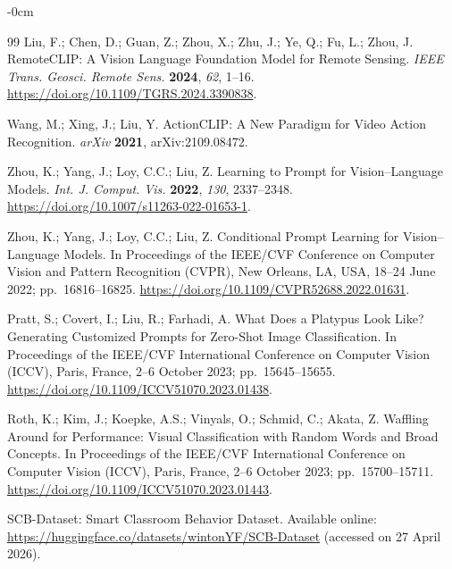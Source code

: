\documentclass[electronics,article,submit,pdftex,moreauthors]{Definitions/mdpi}
\begin{document}
\begin{adjustwidth}{-\extralength}{0cm}
\begin{thebibliography}{99}
Liu, F.; Chen, D.; Guan, Z.; Zhou, X.; Zhu, J.; Ye, Q.; Fu, L.; Zhou, J.
RemoteCLIP: A Vision Language Foundation Model for Remote Sensing.
\textit{IEEE Trans. Geosci. Remote Sens.} \textbf{2024}, \textit{62}, 1--16. \url{https://doi.org/10.1109/TGRS.2024.3390838}.

Wang, M.; Xing, J.; Liu, Y.
ActionCLIP: A New Paradigm for Video Action Recognition.
\textit{arXiv} \textbf{2021}, arXiv:2109.08472.

Zhou, K.; Yang, J.; Loy, C.C.; Liu, Z.
Learning to Prompt for Vision--Language Models.
\textit{Int. J. Comput. Vis.} \textbf{2022}, \textit{130}, 2337--2348. \url{https://doi.org/10.1007/s11263-022-01653-1}.

Zhou, K.; Yang, J.; Loy, C.C.; Liu, Z.
Conditional Prompt Learning for Vision--Language Models.
In Proceedings of the IEEE/CVF Conference on Computer Vision and Pattern Recognition (CVPR), New Orleans, LA, USA, 18--24 June 2022; pp.~16816--16825. \url{https://doi.org/10.1109/CVPR52688.2022.01631}.

Pratt, S.; Covert, I.; Liu, R.; Farhadi, A.
What Does a Platypus Look Like? Generating Customized Prompts for Zero-Shot Image Classification.
In Proceedings of the IEEE/CVF International Conference on Computer Vision (ICCV), Paris, France, 2--6 October 2023; pp.~15645--15655. \url{https://doi.org/10.1109/ICCV51070.2023.01438}.

Roth, K.; Kim, J.; Koepke, A.S.; Vinyals, O.; Schmid, C.; Akata, Z.
Waffling Around for Performance: Visual Classification with Random Words and Broad Concepts.
In Proceedings of the IEEE/CVF International Conference on Computer Vision (ICCV), Paris, France, 2--6 October 2023; pp.~15700--15711. \url{https://doi.org/10.1109/ICCV51070.2023.01443}.

SCB-Dataset: Smart Classroom Behavior Dataset.
Available online: \url{https://huggingface.co/datasets/wintonYF/SCB-Dataset} (accessed on 27 April 2026).

\end{thebibliography}

\end{adjustwidth}
\end{document}
